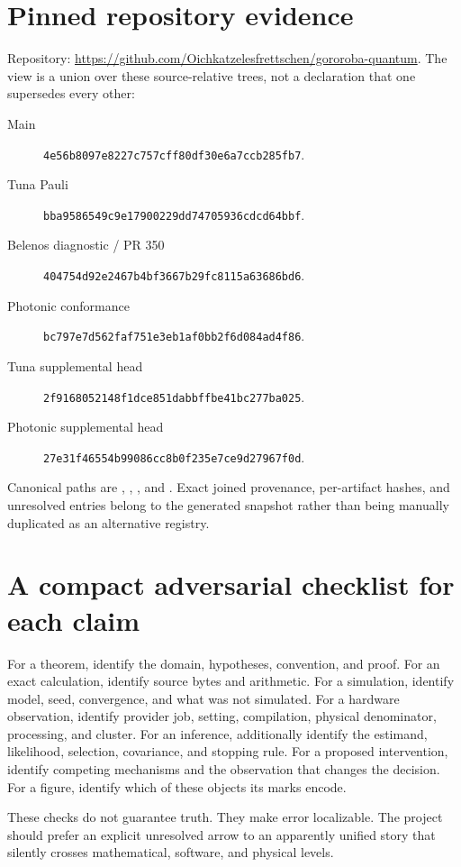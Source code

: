 \documentclass[11pt,a4paper]{article}
\begin{document}
\section{Pinned repository evidence}\label{app:pins}
Repository: \url{https://github.com/Oichkatzelesfrettschen/gororoba-quantum}. The view is a union over these source-relative trees, not a declaration that one supersedes every other:
\begin{description}
\item[Main] \texttt{4e56b8097e8227c757cff80df30e6a7ccb285fb7}.
\item[Tuna Pauli] \texttt{bba9586549c9e17900229dd74705936cdcd64bbf}.
\item[Belenos diagnostic / PR 350] \texttt{404754d92e2467b4bf3667b29fc8115a63686bd6}.
\item[Photonic conformance] \texttt{bc797e7d562faf751e3eb1af0bb2f6d084ad4f86}.
\item[Tuna supplemental head] \texttt{2f9168052148f1dce851dabbffbe41bc277ba025}.
\item[Photonic supplemental head] \texttt{27e31f46554b99086cc8b0f235e7ce9d27967f0d}.
\end{description}
Canonical paths are , , , and . Exact joined provenance, per-artifact hashes, and unresolved entries belong to the generated snapshot rather than being manually duplicated as an alternative registry.

\section{A compact adversarial checklist for each claim}
For a theorem, identify the domain, hypotheses, convention, and proof. For an exact calculation, identify source bytes and arithmetic. For a simulation, identify model, seed, convergence, and what was not simulated. For a hardware observation, identify provider job, setting, compilation, physical denominator, processing, and cluster. For an inference, additionally identify the estimand, likelihood, selection, covariance, and stopping rule. For a proposed intervention, identify competing mechanisms and the observation that changes the decision. For a figure, identify which of these objects its marks encode.

These checks do not guarantee truth. They make error localizable. The project should prefer an explicit unresolved arrow to an apparently unified story that silently crosses mathematical, software, and physical levels.
\end{document}
